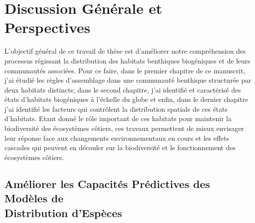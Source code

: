 \begin{refsection}

\hypertarget{discussion-guxe9nuxe9rale-et-perspectives}{%
\chapter{Discussion Générale et
Perspectives}\label{discussion-guxe9nuxe9rale-et-perspectives}}

L'objectif général de ce travail de thèse est d'améliorer notre
compréhension des processus régissant la distribution des habitats
benthiques biogéniques et de leurs communautés associées. Pour ce faire,
dans le premier chapitre de ce manuscrit, j'ai étudié les règles
d'assemblage dans une communauté benthique structurée par deux habitats
distincts; dans le second chapitre, j'ai identifié et caractérisé des
états d'habitats biogéniques à l'échelle du globe et enfin, dans le
dernier chapitre j'ai identifié les facteurs qui contrôlent la
distribution spatiale de ces états d'habitats. Etant donné le rôle
important de ces habitats pour maintenir la biodiversité des écosystèmes
côtiers, ces travaux permettent de mieux envisager leur réponse face aux
changements environnementaux en cours et les effets cascades qui peuvent
en découler sur la biodiversité et le fonctionnement des écosystèmes
côtiers.

\hypertarget{amuxe9liorer-les-capacituxe9s-pruxe9dictives-des-moduxe8les-de-distribution-despuxe8ces}{%
\section{Améliorer les Capacités Prédictives des Modèles de \\Distribution
d'Espèces}\label{amuxe9liorer-les-capacituxe9s-pruxe9dictives-des-moduxe8les-de-distribution-despuxe8ces}}


\end{refsection}
